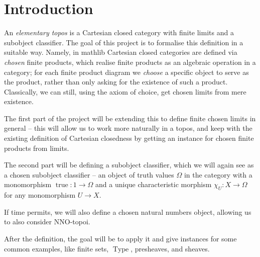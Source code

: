 %   

\section{Introduction}

An \emph{elementary topos} is a Cartesian closed category with finite limits and a subobject classifier. The goal of this project is to formalise this definition in a suitable way. Namely, in mathlib Cartesian closed categories are defined via \emph{chosen} finite products, which realise finite products as an algebraic operation in a category; for each finite product diagram we \emph{choose} a specific object to serve as the product, rather than only asking for the existence of such a product. Classically, we can still, using the axiom of choice, get chosen limits from mere existence.

The first part of the project will be extending this to define finite chosen limits in general -- this will allow us to work more naturally in a topos, and keep with the existing definition of Cartesian closedness by getting an instance for chosen finite products from limits.

The second part will be defining a subobject classifier, which we will again see as a chosen subobject classifier -- an object of truth values $\Omega$ in the category with a monomorphism $\operatorname{true} : 1 \rightarrow \Omega$ and a unique characteristic morphism $\chi_{U} : X \rightarrow \Omega$ for any monomorphism $U \rightarrow X$.

If time permits, we will also define a chosen natural numbers object, allowing us to also consider NNO-topoi.

After the definition, the goal will be to apply it and give instances for some common examples, like finite sets, $\operatorname{Type}$, presheaves, and sheaves.

